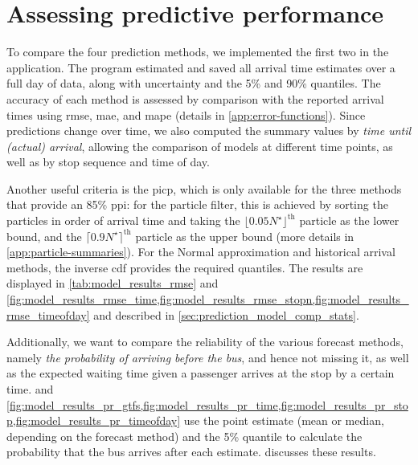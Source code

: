 \section{Assessing predictive performance}
\label{sec:prediction_model_comparison}

To compare the four prediction methods, we implemented the first two in the  application. The program estimated and saved all arrival time estimates over a full day of data, along with uncertainty and the 5\% and 90\% quantiles. The accuracy of each method is assessed by comparison with the reported arrival times using \gls{rmse}, \gls{mae}, and \gls{mape} (details in \cref{app:error-functions}). Since predictions change over time, we also computed the summary values by \emph{time until (actual) arrival}, allowing the comparison of models at different time points, as well as by stop sequence and time of day.


Another useful criteria is the \gls{picp}, which is only available for the three methods that provide an 85\% \gls{ppi}: for the particle filter, this is achieved by sorting the particles in order of arrival time and taking the $\lfloor 0.05 N^\star\rfloor^{\text{th}}$ particle as the lower bound, and the $\lceil 0.9 N^\star\rceil^{\text{th}}$ particle as the upper bound (more details in \cref{app:particle-summaries}). For the Normal approximation and historical arrival methods, the inverse \gls{cdf} provides the required quantiles. The results are displayed in \cref{tab:model_results_rmse} and \cref{fig:model_results_rmse_time,fig:model_results_rmse_stopn,fig:model_results_rmse_timeofday} and described in \cref{sec:prediction_model_comp_stats}.


Additionally, we want to compare the reliability of the various forecast methods, namely \emph{the probability of arriving before the bus}, and hence not missing it, as well as the expected waiting time given a passenger arrives at the stop by a certain time.  and \cref{fig:model_results_pr_gtfs,fig:model_results_pr_time,fig:model_results_pr_stop,fig:model_results_pr_timeofday} use the point estimate (mean or median, depending on the forecast method) and the 5\% quantile to calculate the probability that the bus arrives after each estimate.  discusses these results.





